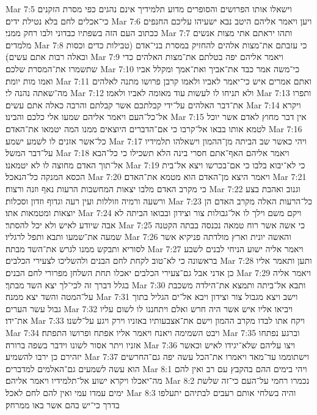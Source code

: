 Mar 7:5  וישאלו אותו הפרושים והסופרים מדוע תלמידיך אינם נהגים כפי מסרת הזקנים כי־אכלים לחם בלא נטילת ידים׃
Mar 7:6  ויען ויאמר אליהם היטב נבא ישעיהו עליכם החנפים ככתוב העם הזה בשפתיו כבדוני ולבו רחק ממני׃
Mar 7:7  ותהו יראתם אתי מצות אנשים מלמדים׃
Mar 7:8  כי עזבתם את־מצות אלהים להחזיק במסרת בני־אדם (טבילות כדים וכסות וכאלה רבות אתם עשים)׃
Mar 7:9  ויאמר אליהם יפה בטלתם את־מצות האלהים כדי שתשמרו את־המסרת שלכם׃
Mar 7:10  כי־משה אמר כבד את־אביך ואת־אמך ומקלל אביו ואמו מות יומת׃
Mar 7:11  ואתם אמרים איש כי־יאמר לאביו ולאמו קרבן פרושו מתנה לאלהים מה־שאתה נהנה לי׃
Mar 7:12  ולא תניחו לו לעשות עוד מאומה לאביו ולאמו׃
Mar 7:13  ותפרו את־דבר האלהים על־ידי קבלתכם אשר קבלתם והרבה כאלה אתם עשים׃
Mar 7:14  ויקרא אל־כל־העם ויאמר אליהם שמעו אלי כלכם והבינו׃
Mar 7:15  אין דבר מחוץ לאדם אשר יוכל לטמא אותו בבאו אל־קרבו כי אם־הדברים היוצאים ממנו המה יטמאו את־האדם׃
Mar 7:16  כל־אשר אזנים לו לשמע ישמע׃
Mar 7:17  ויהי כאשר שב הביתה מן־ההמון וישאלהו תלמידיו על־דבר המשל׃
Mar 7:18  ויאמר אליהם האף־אתם חסרי בינה הלא תשכילו כי כל־הבא אל־תוך האדם מחוצה לו לא יטמאנו׃
Mar 7:19  כי לא־יבוא בלבו כי אם־בכרשו ויצא אל־בית הכסא המנקה כל־הנאכל׃
Mar 7:20  ויאמר היצא מן־האדם הוא מטמא את־האדם׃
Mar 7:21  כי מקרב האדם מלבו יצאות המחשבות הרעות נאף וזנה ורצוח׃
Mar 7:22  וגנוב ואהבת בצע ורשעה ורמיה וזוללות ועין רעה וגדוף וזדון וסכלות׃
Mar 7:23  כל־הרעות האלה מקרב האדם הן יוצאות ומטמאות אתו׃
Mar 7:24  ויקם משם וילך לו אל־גבולות צור וצידון ובבואו הביתה לא אבה שיודע לאיש ולא יכל להסתר׃
Mar 7:25  כי אשה אשר רוח טמאה נכנסה בבתה הקטנה שמעה את־שמעו ותבא ותפל לרגליו׃
Mar 7:26  והאשה יונית וארץ מולדתה פניקיא אשר לסוריא ותבקש ממנו לגרש את־השד מבתה׃
Mar 7:27  ויאמר אליה ישוע הניחי לבנים לשבע בראשונה כי לא־טוב לקחת לחם הבנים ולהשליכו לצעירי הכלבים׃
Mar 7:28  ותען ותאמר אליו כן אדני אבל גם־צעירי הכלבים יאכלו תחת השלחן מפרורי לחם הבנים׃
Mar 7:29  ויאמר אליה בגלל דברך זה לכי־לך יצא השד מבתך׃
Mar 7:30  ותבא אל־ביתה ותמצא את־הילדה משכבת על־המטה והשד יצא ממנה׃
Mar 7:31  וישב ויצא מגבול צור וצידון ויבא אל־ים הגליל בתוך גבול עשר הערים׃
Mar 7:32  ויביאו אליו איש אשר היה חרש ואלם ויתחננו לו לשום עליו את־ידו׃
Mar 7:33  ויקח אתו לבדו מקרב ההמון וישם את־אצבעותיו באזניו וירק ויגע על־לשנו׃
Mar 7:34  ויבט השמימה ויאנח ויאמר אליו אפתח ופרושו התפתח׃
Mar 7:35  וברגע נפתחו אזניו ויתר אסור לשונו וידבר בשפה ברורה׃
Mar 7:36  ויצו עליהם שלא־יגידו לאיש וכאשר יזהירם כן ירבו להשמיע׃
Mar 7:37  וישתוממו עד־מאד ויאמרו את־הכל עשה יפה גם־החרשים הוא עשה לשמעים גם־האלמים למדברים׃
Mar 8:1  ויהי בימים ההם בהקבץ עם רב ואין להם מה־יאכלו ויקרא ישוע אל־תלמידיו ויאמר אליהם׃
Mar 8:2  נכמרו רחמי על־העם כי־זה שלשת ימים עמדו עמי ואין להם לחם לאכל׃
Mar 8:3  והיה בשלחי אותם רעבים לבתיהם יתעלפו בדרך כי־יש בהם אשר באו ממרחק׃
